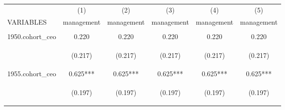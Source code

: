 \begin{center}
\begin{tabular}{lccccc} \hline
 & (1) & (2) & (3) & (4) & (5) \\
VARIABLES & management & management & management & management & management \\ \hline
\vspace{4pt} & \begin{footnotesize}\end{footnotesize} & \begin{footnotesize}\end{footnotesize} & \begin{footnotesize}\end{footnotesize} & \begin{footnotesize}\end{footnotesize} & \begin{footnotesize}\end{footnotesize} \\
1950.cohort\_ceo & 0.220 & 0.220 & 0.220 & 0.220 & 0.220 \\
\vspace{4pt} & \begin{footnotesize}(0.217)\end{footnotesize} & \begin{footnotesize}(0.217)\end{footnotesize} & \begin{footnotesize}(0.217)\end{footnotesize} & \begin{footnotesize}(0.217)\end{footnotesize} & \begin{footnotesize}(0.217)\end{footnotesize} \\
1955.cohort\_ceo & 0.625*** & 0.625*** & 0.625*** & 0.625*** & 0.625*** \\
\vspace{4pt} & \begin{footnotesize}(0.197)\end{footnotesize} & \begin{footnotesize}(0.197)\end{footnotesize} & \begin{footnotesize}(0.197)\end{footnotesize} & \begin{footnotesize}(0.197)\end{footnotesize} & \begin{footnotesize}(0.197)\end{footnotesize} \\

\end{tabular}
\end{center}
